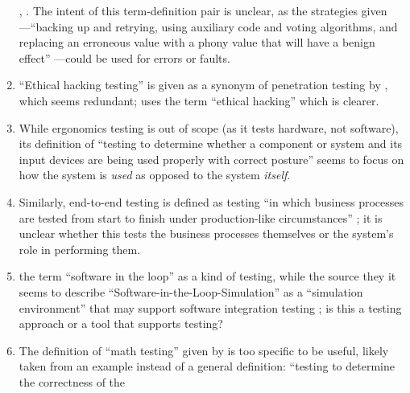 \begin{enumerate}
              \cite[p.~5\=/3]{SWEBOK2024},
              \cite[pp.~399--400]{vanVliet2000}\fi. The intent of this
          term-definition pair is unclear, as the strategies given---``backing
          up and retrying, using auxiliary code and voting algorithms, and
          replacing an erroneous value with a phony value that will have a
          benign effect'' \citep[p.~4\=/11]{SWEBOK2024}---could be used for
          errors or faults.
    \item %
          ``Ethical hacking testing'' is given as a synonym of penetration
          testing by \citet[p.~13-4]{SWEBOK2024}, which seems redundant;
          \citet[p.~28]{Gerrard2000b} uses the term ``ethical hacking'' which
          is clearer.
    \item %
          While ergonomics testing is out of scope (as it tests hardware, not
          software), its definition of ``testing to determine whether a
          component or system and its input devices are being used properly
          with correct posture'' \citepISTQB{} seems to focus on how the
          system is \emph{used} as opposed to the system \emph{itself}.
    \item %
          Similarly, end-to-end testing is defined as testing ``in which
          business processes are tested from start to finish under
          production-like circumstances'' \citepISTQB{}; it is unclear
          whether this tests the business processes themselves or the system's
          role in performing them.
    \item %
           \citetISTQB{}  the term
          ``software in the loop'' as a kind of testing, while the source
          \ifnotpaper they \else it \fi {} seems to
          describe ``Software-in-the-Loop-Simulation'' as a ``simulation
          environment'' that may support software integration testing
          \citep[p.~153]{SPICE2022}; is this a testing approach or a tool
          that supports testing?
    \item %
          The definition of ``math testing'' given by \citetISTQB{} is
          too specific to be useful, likely taken from an example instead of
          a general definition: ``testing to determine the correctness of the

\end{enumerate}
